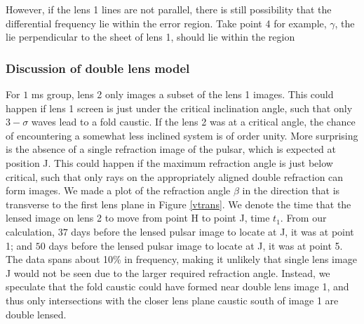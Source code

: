 \documentclass[useAMS,usenatbib]{mn2e}
\begin{document}
However, if the lens 1 lines are not parallel, there is still possibility that the differential frequency lie within the error region. Take point 4 for example, $\gamma$, the lie perpendicular to the sheet of lens 1, should lie within the region 

\subsubsection{Discussion of double lens model}
For $1$ ms group, lens 2
only images a subset of the lens 1 images.  This could happen if
lens 1 screen is just under the critical inclination
angle, such that only $3-\sigma$ waves lead to a fold caustic.  If the lens 2 was at a critical angle, the chance of encountering a
somewhat less inclined system is of order unity.
More surprising is the absence of a single refraction
image of the pulsar, which is expected at position J.  This could
happen if the maximum refraction angle is just below critical, such
that only rays on the appropriately aligned double refraction can form
images.  
We made a plot of the refraction angle $\beta$ in the
direction that is transverse to the first lens plane in Figure
\ref{vtrans}. We denote the time that the lensed image on lens 2 to move from point H to point J, time $t_1$. From our calculation, $37$ days before the lensed pulsar
 image to locate at J, it was at point 1; and $50$ days before the lensed pulsar image to locate at J, it was at point 5.  The data
spans about 10\% in frequency, making it unlikely that single lens
image J would not be seen due to the larger required refraction
angle.  Instead, we speculate that the fold caustic could have formed
near double lens image 1, and thus only intersections with the closer
lens plane caustic south of image 1 are double lensed.
\end{document}
